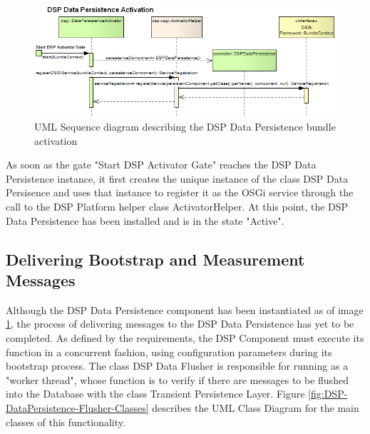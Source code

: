 \begin{figure}[!b]
  \centering
  \includegraphics[scale=0.5]{../diagrams/From-OSGi-Framework-to-DSP-Data-PersistenceActivator-Sequence-Diagram}
  \caption{UML Sequence diagram describing the DSP Data Persistence bundle activation}
  \label{fig:From-OSGi-Framework-to-DSP-Data-PersistenceActivator-Sequence-Diagram}
\end{figure}

As soon as the gate "Start DSP Activator Gate" reaches the DSP Data
Persistence instance, it first creates the unique instance of the class DSP
Data Persisence and uses that instance to register it as the OSGi service
through the call to the DSP Platform helper class ActivatorHelper. At this
point, the DSP Data Persistence has been installed and is in the state
"Active".

\subsection{Delivering Bootstrap and Measurement Messages}

Although the DSP Data Persistence component has been instantiated as of image
\ref{fig:From-OSGi-Framework-to-DSP-Data-PersistenceActivator-Sequence-Diagram}, 
the process of delivering messages to the DSP Data Persistence has yet to be
completed. As defined by the requirements, the DSP Component must execute its
function in a concurrent fashion, using configuration parameters during its
bootstrap process. The class DSP Data Flusher is responsible for running as a
"worker thread", whose function is to verify if there are messages to be
flushed into the Database with the class Transient Persistence Layer. Figure 
\ref{fig:DSP-DataPersistence-Flusher-Classes} describes the UML Class
Diagram \cite{uml} for the main classes of this functionality.

